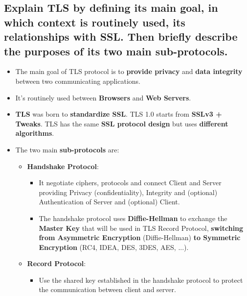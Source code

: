 \documentclass[9pt, letterpaper]{article}
\begin{document}
\subsection{Explain TLS by defining its main goal, in which context is routinely used, its relationships with SSL. Then briefly describe the purposes of its two main sub-protocols.}
\begin{itemize}
	\item The main goal of TLS protocol is to \textbf{provide privacy} and \textbf{data integrity} between two communicating applications.
	\item It's routinely used between \textbf{Browsers} and \textbf{Web Servers}.
	\item \textbf{TLS} was born to \textbf{standardize SSL}. TLS 1.0 starts from \textbf{SSLv3 + Tweaks}. TLS has the same \textbf{SSL protocol design} but uses \textbf{different algorithms}.
	\item The two main \textbf{sub-protocols} are:
	      \begin{itemize}
		      \item \textbf{Handshake Protocol}:
		            \begin{itemize}
			            \item It negotiate ciphers, protocols and connect Client and Server providing Privacy (confidentiality), Integrity and (optional) Authentication of Server and (optional) Client.
			            \item The handshake protocol uses \textbf{Diffie-Hellman} to exchange the \textbf{Master Key} that will be used in TLS Record Protocol, \textbf{switching from Asymmetric Encryption} (Diffie-Hellman) \textbf{to Symmetric Encryption} (RC4, IDEA, DES, 3DES, AES, ...).
		            \end{itemize}
		      \item \textbf{Record Protocol}:
		            \begin{itemize}
			            \item Use the shared key established in the handshake protocol to protect the communication between client and server.
		            \end{itemize}
	      \end{itemize}
\end{itemize}
\end{document}
